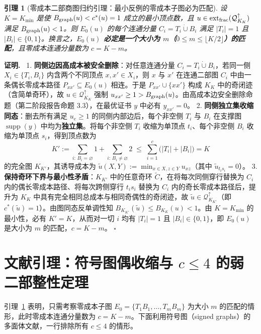 \documentclass[11pt,a4paper]{ctexart}
\newtheorem{lemma}[theorem]{引理}
\theoremstyle{definition}
\newenvironment{proofcn}{\par\noindent\textbf{证明.}\ }{\hfill$\square$\par}
\newcommand{\1}{\boldsymbol 1}
\newcommand{\0}{\boldsymbol 0}
\newcommand{\bgraph}{B_{\rm graph}}
\newcommand{\ct}{c^*}
\begin{document}
\begin{lemma}[零成本二部商图归约引理：最小反例的零成本子图必为匹配]\label{lem:matching_reduction}
设 $K=K_{\min}$ 是使 $\bgraph(u)<\ct(u)=1$ 成立的最小顶点数，且 $u\in\operatorname{ext}_{\rm frac}(\mathcal Q_{K_K}^{\uparrow})$ 满足 $\bgraph(u)<1$。则 $E_0(u)$ 的每个连通分量 $C_i=T_i\dot\cup B_i$ 满足 $|T_i|=1$ 且 $|B_i|\in\{0,1\}$。换言之，\textbf{$E_0(u)$ 必定是一个大小为 $m$（$0\le m\le\lfloor K/2\rfloor$）的匹配}，且零成本连通分量数为 $c=K-m$。
\end{lemma}
\begin{proofcn}
1. \textbf{同侧边因高成本被安全删除}：对任意连通分量 $C_i=T_i\dot\cup B_i$，若同一侧 $X_i\in\{T_i,B_i\}$ 内含两个不同顶点 $x,x'\in X_i$，则 $x$ 与 $x'$ 在连通二部图 $C_i$ 中由一条偶长零成本路径 $P_{xx'}\subseteq E_0(u)$ 相连。于是 $P_{xx'}\cup\{xx'\}$ 构成 $K_K$ 中的奇闭迹（含简单奇环），故 $u\in\mathcal Q_{K_K}^{\uparrow}$ 强制 $u_{xx'}\ge 1>\bgraph(u)$。由高成本边安全删除命题（第二阶段报告命题 3.3），在最优证书 $y$ 中必有 $y_{xx'}=0$。
2. \textbf{同侧独立集收缩同态}：删去所有满足 $u_e\ge 1$ 的同侧内部边后，每个非空侧 $T_i$ 与 $B_i$ 在支撑图 $\operatorname{supp}(y)$ 中均为\textbf{独立集}。将每个非空侧 $T_i$ 收缩为单顶点 $t_i$、每个非空侧 $B_i$ 收缩为单顶点 $s_i$，得到顶点数为
\[
 K' := \sum_{i:\,B_i=\varnothing} 1 + \sum_{i:\,B_i\neq\varnothing} 2 \;\le\; \sum_{i=1}^c\bigl(|T_i|+|B_i|\bigr) = K
\]
的完全图 $K_{K'}$，其诱导成本为 $\tilde u(X,Y):=\min_{x\in X,z\in Y}u_{xz}$（其中 $\tilde u_{t_is_i}=0$）。
3. \textbf{保持奇环下界与最小性矛盾}：$K_{K'}$ 中的任意奇环 $\tilde C$，在将每次同侧穿行替换为 $C_i$ 内的偶长零成本路径、将每次跨侧穿行 $t_is_i$ 替换为 $C_i$ 内的奇长零成本路径后，提升为 $K_K$ 中具有完全相同总成本与相同奇偶性的奇闭迹，故 $\tilde u\in\mathcal Q_{K_{K'}}^{\uparrow}$（即 $\ct(\tilde u)=1$）。由图同态反单调性知 $B_{K_{K'}}(\tilde u)\le B_{K_K}(u)<1$。由 $K=K_{\min}$ 的最小性，必有 $K'=K$，从而对一切 $i$ 均有 $|T_i|=1$ 且 $|B_i|\in\{0,1\}$，即 $E_0(u)$ 是大小为 $m$ 的匹配，$c=K-m$。
\end{proofcn}

\section{文献引理：符号图偶收缩与 $c\le 4$ 的弱二部整性定理}

引理~\ref{lem:matching_reduction} 表明，只需考察零成本子图 $E_0=\{T_1B_1,\dots,T_mB_m\}$ 为大小 $m$ 的匹配的情形，此时零成本连通分量数为 $c=K-m$。下面利用符号图（signed graphs）的多面体文献，一行排除所有 $c\le 4$ 的情形。
\end{document}
